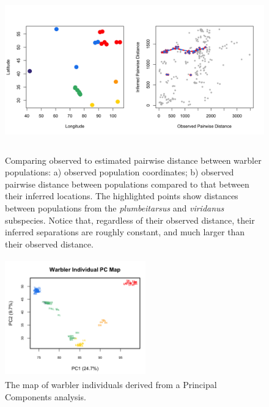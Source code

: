\documentclass[12pt]{article}
\newcommand{\gc}[1]{{\it\color{blue}{(#1)}}}
\begin{document}
\begin{figure}
\centering
	{\includegraphics[width=6in,height=2.5in]{figs/warblers/warb_pop_dist_compare.png}}
	\caption{Comparing observed to estimated pairwise distance between warbler populations: a) observed population coordinates; b) observed pairwise distance between populations compared to that between their inferred locations.  The highlighted points show distances between populations from the \textit{plumbeitarsus} and \textit{viridanus} subspecies.  Notice that, regardless of their observed distance, their inferred separations are roughly constant, and much larger than their observed distance.}
	\label{sfig:warb_pop_distcomp}
\end{figure}

\begin{figure}
	\centering
	\includegraphics[width=2.4in,height=2in]{figs/warblers/warb_ind_PC_map.png}
	\caption{The map of warbler individuals derived from a Principal Components analysis.}
	\label{sfig:warb_ind_PC_map}
\end{figure}

\end{document}
